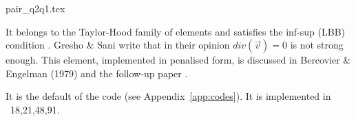 \begin{flushright} {\tiny {\color{gray} pair\_q2q1.tex}} \end{flushright}

\noindent
\begin{minipage}{0.48\textwidth}
\begin{center}

\end{center}
\end{minipage}
\hfill
\begin{minipage}{0.48\textwidth}
\begin{center}

\end{center}
\end{minipage}

It belongs to the Taylor-Hood family of elements and satisfies the inf-sup (LBB) condition \cite[p215]{hugh}.
Gresho \& Sani \cite[p554]{grsa} write that in their opinion $div(\vec v)=0$ is not strong enough.
This element, implemented in penalised form, is discussed in Bercovier \& Engelman (1979) \cite{been79} 
and the follow-up paper \cite{been80}. 

It is the default of the \aspect code (see Appendix~\ref{app:codes}).
It is implemented in \stone~18,21,48,91.
 


